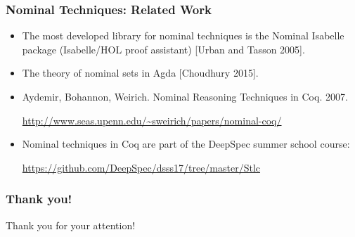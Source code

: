 \documentclass[10pt]{beamer}
\begin{document}
\begin{frame}
  \frametitle{Nominal Techniques: Related Work}
  \begin{itemize}
  \item The most developed library for nominal techniques is the Nominal
    Isabelle package (Isabelle/HOL proof assistant) [Urban and Tasson 2005].
  \item The theory of nominal sets in Agda [Choudhury 2015].
  \item Aydemir, Bohannon, Weirich. Nominal Reasoning Techniques in Coq. 2007.

    \small{\url{http://www.seas.upenn.edu/~sweirich/papers/nominal-coq/}}
  \item Nominal techniques in Coq are part of the DeepSpec summer school course:

    \small\url{https://github.com/DeepSpec/dsss17/tree/master/Stlc}
  \end{itemize}
\end{frame}

\begin{frame}
  \frametitle{Thank you!}
  \Large Thank you for your attention!
\end{frame}
\end{document}
